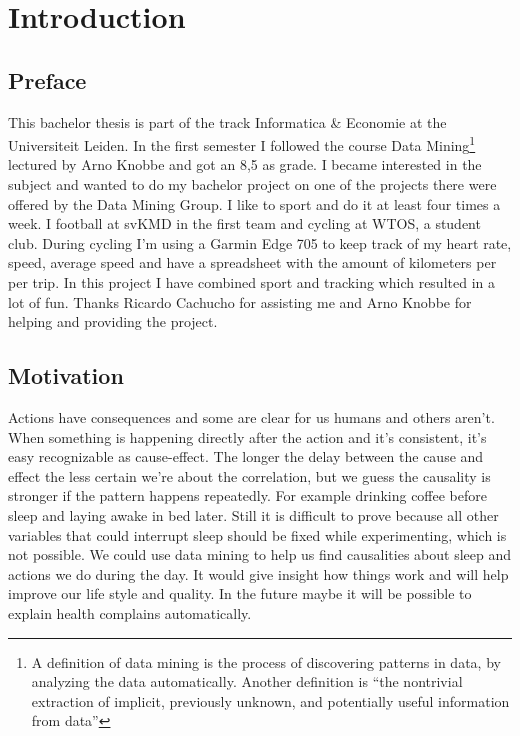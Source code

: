 \section{Introduction}
	\subsection{Preface}
		This bachelor thesis is part of the track Informatica \& Economie at the Universiteit Leiden. In the first semester I followed the course Data Mining\footnote{A definition of data mining is the process of discovering patterns in data, by analyzing the data automatically\cite{datamining}. Another definition is ``the nontrivial extraction of implicit, previously unknown, and potentially useful information from data''\cite{frawley}} lectured by Arno Knobbe and got an 8,5 as grade. I became interested in the subject and wanted to do my bachelor project on one of the projects there were offered by the Data Mining Group. I like to sport and do it at least four times a week. I football at svKMD in the first team and cycling at WTOS, a student club. During cycling I'm using a Garmin Edge 705 to keep track of my heart rate, speed, average speed and have a spreadsheet with the amount of kilometers per per trip. In this project I have combined sport and tracking which resulted in a lot of fun. Thanks Ricardo Cachucho for assisting me and Arno Knobbe for helping and providing the project.

	\subsection{Motivation}
		\label{seq:motivation}
		Actions have consequences and some are clear for us humans and others aren't. When something is happening directly after the action and it's consistent, it's easy recognizable as cause-effect. The longer the delay between the cause and effect the less certain we're about the correlation, but we guess the causality is stronger if the pattern happens repeatedly. For example drinking coffee before sleep and laying awake in bed later. Still it is difficult to prove because all other variables that could interrupt sleep should be fixed while experimenting, which is not possible. We could use data mining to help us find causalities about sleep and actions we do during the day. It would give insight how things work and will help improve our life style and quality. In the future maybe it will be possible to explain health complains automatically.

